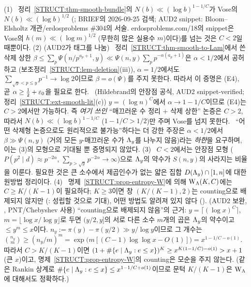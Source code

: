 \begin{remark}\label{STRUCT:rem-smooth-honest}
(1) \PROVED\ 정리~\ref{STRUCT:thm-smooth-bundle}의 $N(b)\ll(\log b)^{1-1/C}$가 Vose의 $N(b)\ll(\log b)^{1/2}$ (\EXT; BRIEF의 2026-09-25 검색; AUD2 snippet: Bloom--Elsholtz 개관/erdosproblems \#304의 서술. erdosproblems.com/18의 snippet은 Vose의 $h(m)\ll(\log m)^{1/2}$ (무한히 많은 실용수 $m$)이다)를 넘는 것은 $C<2$일 때뿐이다.
(2) (AUD2가 태그를 나눔) \PROVED\ 정리~\ref{STRUCT:thm-smooth-to-Lam}에서 쓴 삭제 상한 $\beta\le\sum_p\Psi(n/p^{a_p+1},y)\ll\Psi(n,y)\sum_pp^{-\alpha(a_p+1)}$은 $\alpha<1/2$에서 공허하고 (보조정리~\ref{STRUCT:lem-deletion}(iii)), $\alpha=1/2$에서도 $\sum_{\sqrt y<p\le y}p^{-1}\to\log2$이므로 $\beta=o(\Psi)$를 주지 못한다. 따라서 이 증명은 (E4), 곧 $\alpha\ge\frac12+\varepsilon_0$을 필요로 한다.
\EXT\ (Hildebrand의 안장점 공식, AUD2 snippet-verified; 정리~\ref{STRUCT:ext-smooth-lit}(c)) $y=(\log n)^C$에서 $\alpha\to1-1/C$이므로 (E4)는 $C>2$에서만 가능하다. 즉 \emph{여기 쓰인} ``매끄러운 수 정리 $+$ 삭제 상한'' 논증은 $C>2$, 따라서 $N(b)\ll(\log b)^{1-1/C}$ ($1-1/C>1/2$)만 주며 Vose를 넘지 못한다.
\HEUR\ ``어떤 삭제형 논증으로도 원리적으로 불가능''하다는 더 강한 주장은 $\alpha<1/2$에서 $\beta\gg\Psi(n,y)$ (거의 모든 $y$-매끄러운 수가 $\Lambda_y$를 나누지 않음)라는 \emph{하한}을 요구하며, 이는 (3)의 모형으로 기대될 뿐 증명되지 않았다.
(3) \HEUR\ $C<2$에서는 안장점 모형 ($P(p^2\mid d)\approx p^{-2\alpha}$, $\sum_{p>\sqrt y}p^{-2\alpha}\to\infty$)으로 $\Lambda_y$의 약수가 $S(n,y)$의 사라지는 비율을 이룬다. 필요한 것은 큰 소수에서 제곱인수가 없는 얇은 집합 $D(\Lambda_y)\cap[1,n]$에 대한 원방법 정리이다.
(4) \PROVED\ 명제~\ref{STRUCT:prop-entropy-W}에 의해 $\mathrm W_\Lambda(K,C)$에는 $C\ge K/(K-1)$이 필요하다; $K\ge3$이면 창 $(K/(K-1),2)$는 counting으로 배제되지 않지만 (\HEUR: 성립할 것으로 기대), 어떤 방법도 알려져 있지 않다 (\OPEN).
(AUD2 보완, \PROVED, PNT/Chebyshev 사용) ``counting으로 배제되지 않음''의 근거: $y=\lceil(\log x)^C\rceil$, $m=\lfloor\log x/\log y\rfloor$로 두면 $(y/2,y]$의 서로 다른 소수 $m$개의 곱은 $\Lambda_y$의 약수이고 $\le y^m\le x$이다. $n_y:=\pi(y)-\pi(y/2)\gg y/\log y$이므로 그 개수는 $\binom{n_y}{m}\ge(n_y/m)^m=\exp\bigl(m[(C-1)\log\log x-O(1)]\bigr)=x^{1-1/C-o(1)}$. 따라서 $C>K/(K-1)$이면 $(1+\#\{e\mid\Lambda_y:e\le x\})^K\ge x^{K(1-1/C)-o(1)}>x+1$ (큰 $x$)이고, 명제~\ref{STRUCT:prop-entropy-W}의 counting은 모순을 주지 않는다. (같은 Rankin 상계로 $\#\{e\mid\Lambda_y:e\le x\}\le x^{1-1/C+o(1)}$이므로 문턱 $K/(K-1)$은 $\mathrm W_\Lambda$에 대해서도 정확하다.)

\end{remark}
